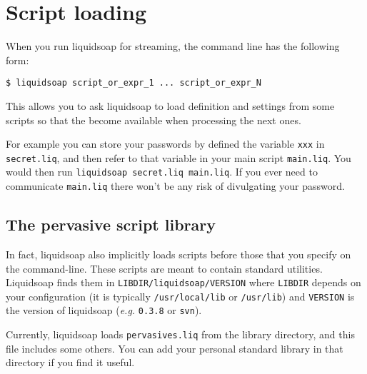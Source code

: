 \section{Script loading}
When you run liquidsoap for streaming, the command line has the following form:

\begin{verbatim}
$ liquidsoap script_or_expr_1 ... script_or_expr_N
\end{verbatim}
This allows you to ask liquidsoap to load definition and settings from
some scripts so that the become available when processing the next ones.

For example you can store your passwords by defined the variable \verb+xxx+
in \verb+secret.liq+, and then refer to that variable in your main script 
\verb+main.liq+. You would then run \verb+liquidsoap secret.liq main.liq+. If you ever 
need to communicate \verb+main.liq+ there won't be any risk of divulgating your 
password.

\subsection{The pervasive script library}
In fact, liquidsoap also implicitly loads scripts before those that you specify 
on the command-line. These scripts are meant to contain standard utilities.
Liquidsoap finds them in \verb+LIBDIR/liquidsoap/VERSION+ where \verb+LIBDIR+ depends on 
your configuration (it is typically \verb+/usr/local/lib+ or \verb+/usr/lib+) and 
\verb+VERSION+ is the version of liquidsoap (\emph{e.g.} \verb+0.3.8+ or \verb+svn+).

Currently, liquidsoap loads \verb+pervasives.liq+ from the library directory,
and this file includes some others.
You can add your personal standard library in that directory
if you find it useful.


